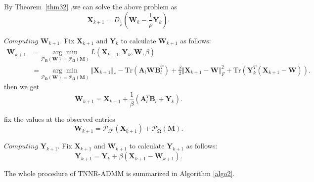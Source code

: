 \documentclass{article}
\begin{document}
{By Theorem~\ref{thm32} ,we can solve the above problem as
\begin{equation}
    \mathbf X_{k+1} = D_{\frac{1}{\rho}}(\mathbf W_k - \frac{1}{\rho}\mathbf Y_k).
\label{admmx}
\end{equation}


$\textit{Computing}$  $\mathbf W_{k+1}$. Fix $\mathbf X_{k+1}$ and $\mathbf Y_k$ to calculate $\mathbf W_{k+1}$ as follows:
\begin{equation}
\begin{aligned}
    \mathbf W_{k+1}& = \underset{\mathcal{P}_{\mathbf\Omega}(\mathbf W) = \mathcal{P}_{\mathbf\Omega}(\mathbf M)}{\arg\min} \ L(\mathbf X_{k+1},\mathbf Y_k,\mathbf W,\beta) \\
    & =  \underset{\mathcal{P}_{\mathbf\Omega}(\mathbf W) = \mathcal{P}_{\mathbf\Omega}(\mathbf M)}{\arg\min} \ \Vert\mathbf X_{k+1}\Vert_* - \text{Tr}(\mathbf A_l \mathbf W \mathbf B_l^T)    + \frac{\beta}{2}\Vert\mathbf X_{k+1}-\mathbf W \Vert_F^2 + \text{Tr}(\mathbf Y_k^T(\mathbf X_{k+1}-\mathbf W)).
\end{aligned}
\end{equation}
then we get
\begin{equation}
    \mathbf W_{k+1} = \mathbf X_{k+1} + \frac{1}{\beta}(\mathbf A_l^T\mathbf B_l + \mathbf Y_k).
\end{equation}

fix the values at the observed entries
\begin{equation}
    \mathbf W_{k+1} = \mathcal{P}_{\Omega^c}(\mathbf X_{k+1}) + \mathcal{P}_{\mathbf\Omega}(\mathbf M).
\end{equation}

$\textit{Computing}$  $\mathbf Y_{k+1}$. Fix $\mathbf X_{k+1}$ and $\mathbf W_{k+1}$ to calculate $\mathbf Y_{k+1}$ as follows:
\begin{equation}
    \mathbf Y_{k+1} = \mathbf Y_{k} + \beta(\mathbf X_{k+1} - \mathbf W_{k+1}).
\end{equation}

The whole procedure of TNNR-ADMM is summarized in Algorithm \ref{algo2}.


}
\end{document}
